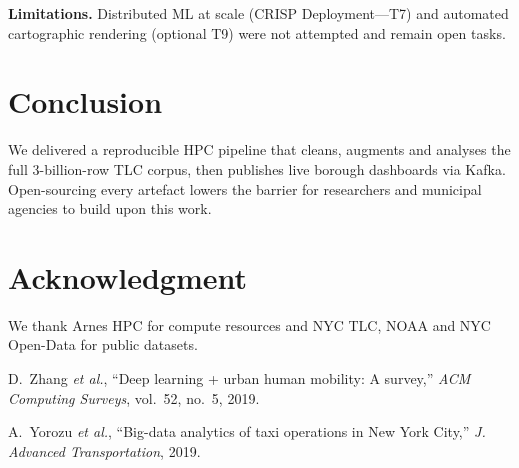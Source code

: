 \documentclass[conference]{IEEEtran}
\begin{document}
\textbf{Limitations.}  
Distributed ML at scale (CRISP Deployment—T7) and automated
cartographic rendering (optional T9) were not attempted and remain open
tasks.

\section{Conclusion}\label{sec:conclusion}
We delivered a reproducible HPC pipeline that cleans, augments and
analyses the full 3-billion-row TLC corpus, then publishes live borough
dashboards via Kafka.  Open-sourcing every artefact lowers the barrier
for researchers and municipal agencies to build upon this work.

\section*{Acknowledgment}
We thank Arnes HPC for compute resources and NYC TLC, NOAA and NYC Open-Data
for public datasets.


\begin{thebibliography}{00}

D.~Zhang \emph{et al.}, “Deep learning + urban human mobility: A survey,”
\emph{ACM Computing Surveys}, vol.~52, no.~5, 2019.

A.~Yorozu \emph{et al.}, “Big-data analytics of taxi operations in New York
City,” \emph{J. Advanced Transportation}, 2019.


\end{thebibliography}
\end{document}
